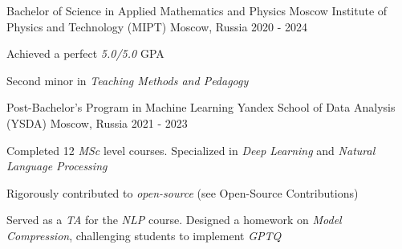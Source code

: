 
\begin{cventries}
  \cventry
    {Bachelor of Science in Applied Mathematics and Physics} %
    {Moscow Institute of Physics and Technology (MIPT)} %
    {Moscow, Russia} %
    {2020 - 2024} %
    {
        \begin{cvitems}
         \item { Achieved a perfect \textit{5.0/5.0} GPA }
         \item { Second minor in \textit{Teaching Methods and Pedagogy} }
        \end{cvitems}
    }
    
  \cventry
    {Post-Bachelor's Program in Machine Learning} %
    {Yandex School of Data Analysis (YSDA)}
    {Moscow, Russia}
    {2021 - 2023}
    {
      \begin{cvitems} %
        \item { Completed 12 \textit{MSc} level courses. Specialized in \textit{Deep Learning} and \textit{Natural Language Processing} }
        \item { Rigorously contributed to \textit{open-source} (see Open-Source Contributions)}
        \item { Served as a \textit{TA} for the \textit{NLP} course. Designed a homework on \textit{Model Compression}, challenging students to implement \textit{GPTQ} }
      \end{cvitems}
    }
\end{cventries}
